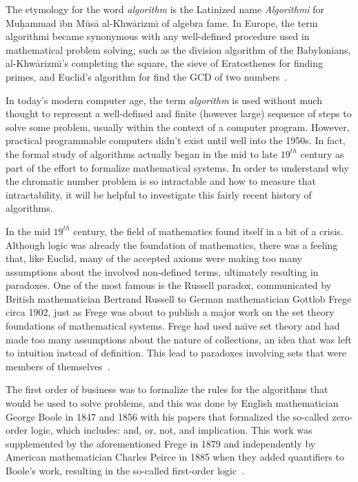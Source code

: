The etymology for the word \emph{algorithm} is the Latinized name \emph{Algorithmi} for Mu\d{h}ammad ibn
M\={u}s\={a} al-Khw\={a}rizm\={\i} of algebra fame.  In Europe, the term algorithmi became synonymous with any
well-defined procedure used in mathematical problem solving, such as the division algorithm of the Babylonians,
al-Khw\={a}rizm\={\i}'s completing the square, the sieve of Eratosthenes for finding primes, and Euclid's algorithm
for find the GCD of two numbers~\cite{bernhardt}.

In today's modern computer age, the term \emph{algorithm} is used without much thought to represent a well-defined
and finite (however large) sequence of steps to solve some problem, usually within the context of a computer
program.  However, practical programmable computers didn't exist until well into the 1950s.  In fact, the formal
study of algorithms actually began in the mid to late \(19^{th}\) century as part of the effort to formalize
mathematical systems.  In order to understand why the chromatic number problem is so intractable and how to measure
that intractability, it will be helpful to investigate this fairly recent history of algorithms.

In the mid \(19^{th}\) century, the field of mathematics found itself in a bit of a crisis.  Although logic was
already the foundation of mathematics, there was a feeling that, like Euclid, many of the accepted axioms were
making too many assumptions about the involved non-defined terms, ultimately resulting in paradoxes.  One of the
most famous is the Russell paradox, communicated by British mathematician Bertrand Russell to German mathematician
Gottlob Frege circa 1902, just as Frege was about to publish a major work on the set theory foundations of
mathematical systems.  Frege had used na\"{\i}ve set theory and had made too many assumptions about the nature of
collections, an idea that was left to intuition instead of definition.  This lead to paradoxes involving sets that
were members of themselves~\cite{bernhardt}.

The first order of business was to formalize the rules for the algorithms that would be used to solve problems, and
this was done by English mathematician George Boole in 1847 and 1856 with his papers that formalized the so-called
zero-order logic, which includes: and, or, not, and implication.  This work was supplemented by the aforementioned
Frege in 1879 and independently by American mathematician Charles Peirce in 1885 when they added quantifiers to
Boole's work, resulting in the so-called first-order logic~\cite{bernhardt}.

